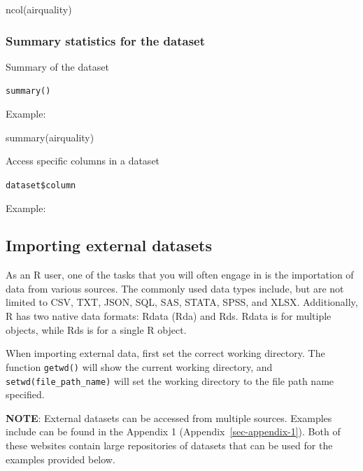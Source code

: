 \documentclass[
  letterpaper,
  DIV=11,
  numbers=noendperiod]{scrreprt}
\newenvironment{Shaded}{}{}
\newcommand{\FunctionTok}[1]{\textcolor[rgb]{0.44,0.26,0.76}{#1}}
\newcommand{\NormalTok}[1]{\textcolor[rgb]{0.14,0.16,0.18}{#1}}
\newcommand{\SpecialCharTok}[1]{\textcolor[rgb]{0.00,0.36,0.77}{#1}}
\begin{document}
\begin{Shaded}
\begin{Highlighting}[]
\FunctionTok{ncol}\NormalTok{(airquality)}
\end{Highlighting}
\end{Shaded}

\subsubsection{Summary statistics for the
dataset}\label{summary-statistics-for-the-dataset}

Summary of the dataset

\texttt{summary()}

Example:

\begin{Shaded}
\begin{Highlighting}[]
\FunctionTok{summary}\NormalTok{(airquality)}
\end{Highlighting}
\end{Shaded}

Access specific columns in a dataset

\texttt{dataset\$column}

Example:

\begin{Shaded}
\end{Shaded}

\subsection{Importing external
datasets}\label{importing-external-datasets}

As an R user, one of the tasks that you will often engage in is the
importation of data from various sources. The commonly used data types
include, but are not limited to CSV, TXT, JSON, SQL, SAS, STATA, SPSS,
and XLSX. Additionally, R has two native data formats: Rdata (Rda) and
Rds. Rdata is for multiple objects, while Rds is for a single R object.

When importing external data, first set the correct working directory.
The function \texttt{getwd()} will show the current working directory,
and \texttt{setwd(file\_path\_name)} will set the working directory to
the file path name specified.

\textbf{NOTE}: External datasets can be accessed from multiple sources.
Examples include can be found in the Appendix 1
(Appendix~\ref{sec-appendix-1}). Both of these websites contain large
repositories of datasets that can be used for the examples provided
below.
\end{document}
